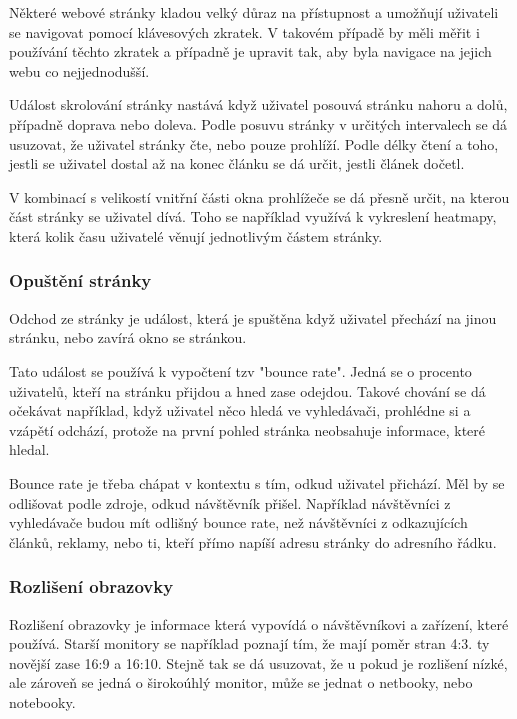 \documentclass[bc,male,java,dept456]{diploma}						%
\begin{document}
Některé webové stránky kladou velký důraz na přístupnost a umožňují uživateli se navigovat pomocí klávesových zkratek. V takovém případě by měli měřit i používání těchto zkratek a případně je upravit tak, aby byla navigace na jejich webu co nejjednodušší.




Událost skrolování stránky nastává když uživatel posouvá stránku nahoru a dolů, případně doprava nebo doleva. Podle  posuvu stránky v určitých intervalech se dá usuzovat, že uživatel stránky čte, nebo pouze prohlíží. Podle délky čtení a toho, jestli se uživatel dostal až na konec článku se dá určit, jestli článek dočetl.

V kombinací s velikostí vnitřní části okna prohlížeče se dá přesně určit, na kterou část stránky se uživatel dívá. Toho se například využívá k vykreslení heatmapy, která kolik času uživatelé věnují jednotlivým částem stránky. 


\subsubsection{Opuštění stránky}
Odchod ze stránky je událost, která je spuštěna když uživatel přechází na jinou stránku, nebo zavírá okno se stránkou. 

Tato událost se používá k vypočtení tzv "bounce rate". Jedná se o procento uživatelů, kteří na stránku přijdou a hned zase odejdou. Takové chování se dá očekávat například, když uživatel něco hledá ve vyhledávači, prohlédne si a vzápětí odchází, protože na první pohled stránka neobsahuje informace, které hledal.

Bounce rate je třeba chápat v kontextu s tím, odkud uživatel přichází. Měl by se odlišovat podle zdroje, odkud návštěvník přišel. Například návštěvníci z vyhledávače budou mít odlišný bounce rate, než návštěvníci z odkazujících článků, reklamy, nebo ti, kteří přímo napíší adresu stránky do adresního řádku.

\subsubsection{Rozlišení obrazovky}

Rozlišení obrazovky je informace která vypovídá o návštěvníkovi a zařízení, které po\-u\-ží\-vá. Starší monitory se například poznají tím, že mají poměr stran 4:3. ty novější zase 16:9 a 16:10. Stejně tak se dá usuzovat, že u pokud je rozlišení nízké, ale zároveň se jedná o širokoúhlý monitor, může se jednat o netbooky, nebo notebooky.
\end{document}
